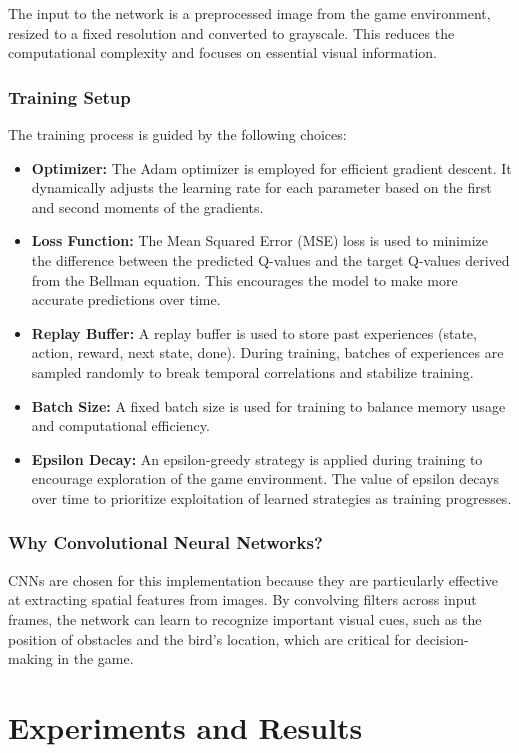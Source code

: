 \documentclass[a4paper,12pt]{article}
\begin{document}
The input to the network is a preprocessed image from the game environment, resized to a fixed resolution and converted to grayscale. This reduces the computational complexity and focuses on essential visual information.

\subsubsection{Training Setup}
The training process is guided by the following choices:
\begin{itemize}
    \item \textbf{Optimizer:} The Adam optimizer is employed for efficient gradient descent. It dynamically adjusts the learning rate for each parameter based on the first and second moments of the gradients.
    \item \textbf{Loss Function:} The Mean Squared Error (MSE) loss is used to minimize the difference between the predicted Q-values and the target Q-values derived from the Bellman equation. This encourages the model to make more accurate predictions over time.
    \item \textbf{Replay Buffer:} A replay buffer is used to store past experiences (state, action, reward, next state, done). During training, batches of experiences are sampled randomly to break temporal correlations and stabilize training.
    \item \textbf{Batch Size:} A fixed batch size is used for training to balance memory usage and computational efficiency.
    \item \textbf{Epsilon Decay:} An epsilon-greedy strategy is applied during training to encourage exploration of the game environment. The value of epsilon decays over time to prioritize exploitation of learned strategies as training progresses.
\end{itemize}

\subsubsection{Why Convolutional Neural Networks?}
CNNs are chosen for this implementation because they are particularly effective at extracting spatial features from images. By convolving filters across input frames, the network can learn to recognize important visual cues, such as the position of obstacles and the bird's location, which are critical for decision-making in the game.

\section{Experiments and Results}
\end{document}
